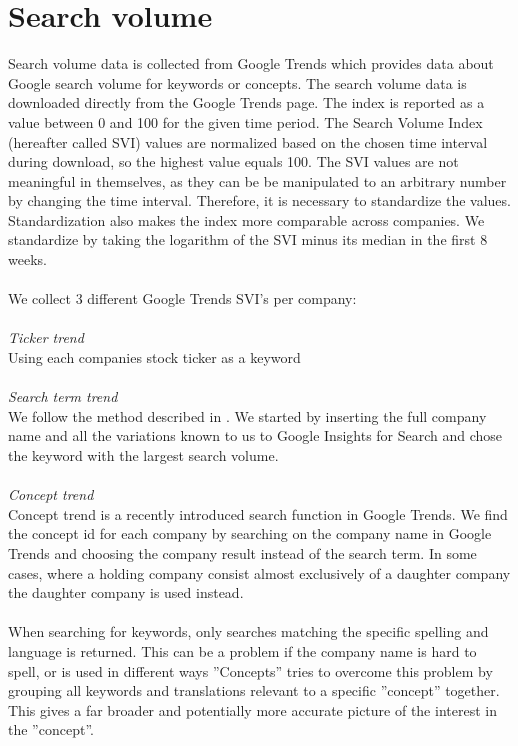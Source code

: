 \section{Search volume}\label{sec:search volume}
Search volume data is collected from Google Trends which provides data about Google search volume for keywords or concepts. The search volume data is downloaded directly from the Google Trends page. The index is reported as a value between 0 and 100 for the given time period. The Search Volume Index (hereafter called SVI) values are normalized based on the chosen time interval during download, so the highest value equals 100. The SVI values are not meaningful in themselves, as they can be be manipulated to an arbitrary number by changing the time interval. Therefore, it is necessary to standardize the values. Standardization also makes the index more comparable across companies. We standardize by taking the logarithm of the SVI minus its median in the first 8 weeks. 
\\\\
We collect 3 different Google Trends SVI's per company:
\\\\
\textit{Ticker trend}
\\
Using each companies stock ticker as a keyword
\\\\
\textit{Search term trend}
\\
We follow the method described in  \cite{vlastakis}. We started by inserting the full company name and all the variations known to us to Google Insights for Search and chose the keyword with the largest search volume.
\\\\
\textit{Concept trend}
\\
Concept trend is a recently introduced search function in Google Trends. We find the concept id for each company by searching on the company name in Google Trends and choosing the company result instead of the search term. In some cases, where a holding company consist almost exclusively of a daughter company the daughter company is used instead.
\\\\
When searching for keywords, only searches matching the specific spelling and language is returned. This can be a problem if the company name is hard to spell, or is used in different ways ”Concepts” tries to overcome this problem by grouping all keywords and translations relevant to a specific ”concept” together. This gives a far broader and potentially more accurate picture of the interest in the ”concept”.
